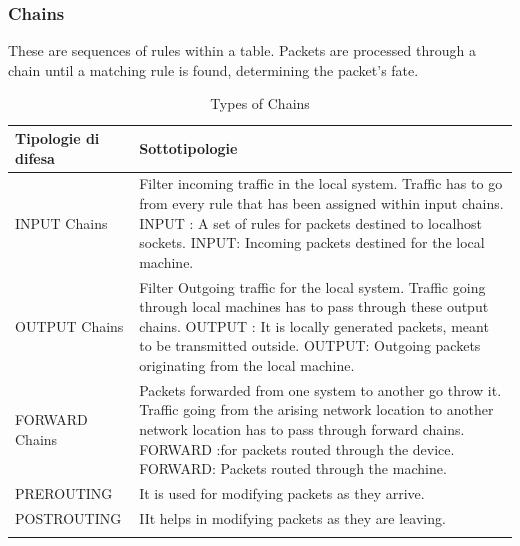 \subsubsection{Chains} 
These are sequences of rules within a table. 
Packets are processed through a chain until a matching rule is found, determining the packet's fate. 
\begin{center} 
\begin{longtable}{|p{}|p{}|} 
    \hline
    \textbf{Tipologie di difesa} & \textbf{Sottotipologie} \\
    \hline 
    INPUT Chains & 
    Filter incoming traffic in the local system. 
    Traffic has to go from every rule that has been assigned within input chains.
    INPUT : A set of rules for packets destined to localhost sockets. 
    INPUT: Incoming packets destined for the local machine.
    \\
    \hline 
    OUTPUT Chains & 
    Filter Outgoing traffic for the local system. 
    Traffic going through local machines has to pass through these output chains. 
    OUTPUT : It is locally generated packets, meant to be transmitted outside. 
    OUTPUT: Outgoing packets originating from the local machine.
    \\
    \hline 
    FORWARD Chains & 
    Packets forwarded from one system to another go throw it. 
    Traffic going from the arising network location to another network location has to pass through forward chains. 
    FORWARD :for packets routed through the device. 
    FORWARD: Packets routed through the machine.
    \\
    \hline 
    PREROUTING & It is used for modifying packets as they arrive. \\ \hline 
    POSTROUTING & IIt helps in modifying packets as they are leaving. \\ \hline 
\caption{Types of Chains} 
\end{longtable} 
\end{center} 

